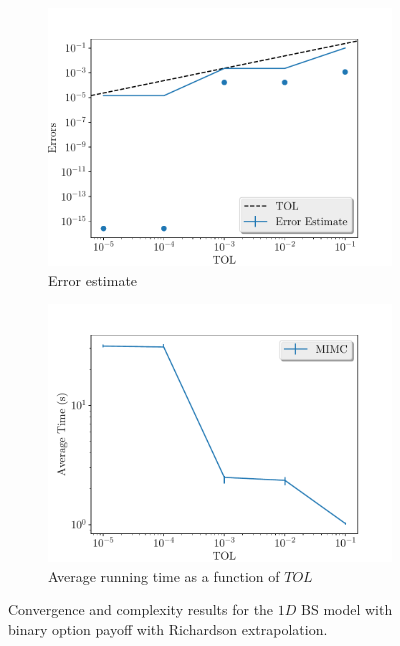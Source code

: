 \documentclass[11pt]{article}
\begin{document}
\begin{figure}[!h]
	\centering
	\begin{subfigure}{.5\textwidth}
		\centering
		\includegraphics[width=1\linewidth]{./figures/binary_2_4_steps/error_estimate.pdf}
		\caption{Error estimate}
		\label{fig:misc_binary_2_4_steps_sub1}
	\end{subfigure}%
	\begin{subfigure}{.5\textwidth}
		\centering
		\includegraphics[width=1\linewidth]{./figures/binary_2_4_steps/average_running_time.pdf}
		\caption{Average running time as a function of $TOL$}
		\label{fig:misc_binary_2_4_steps_sub2}
	\end{subfigure}%
	\caption{Convergence and complexity results for the $1D$ BS model with binary option payoff with Richardson extrapolation.}
	\label{fig:misc_binary_2_4_steps_1}
\end{figure}
\end{document}
